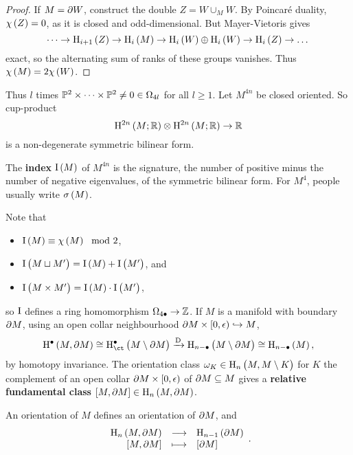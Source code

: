 \begin{proof}
If $ M = \partial W $, construct the double $ Z = W \cup_M W $. By Poincar\'e duality, $ \chi\br{Z} = 0 $, as it is closed and odd-dimensional. But Mayer-Vietoris gives
$$ \dots \to \H_{i + 1}\br{Z} \to \H_i\br{M} \to \H_i\br{W} \oplus \H_i\br{W} \to \H_i\br{Z} \to \dots $$
exact, so the alternating sum of ranks of these groups vanishes. Thus $ \chi\br{M} = 2\chi\br{W} $.
\end{proof}

Thus $ l $ times $ \mathbb{P}^2 \times \dots \times \mathbb{P}^2 \ne 0 \in \Omega_{4l} $ for all $ l \ge 1 $. Let $ M^{4n} $ be closed oriented. So cup-product
$$ \H^{2n}\br{M; \RR} \otimes \H^{2n}\br{M; \RR} \to \RR $$
is a non-degenerate symmetric bilinear form.

\begin{definition*}
The \textbf{index} $ \I\br{M} $ of $ M^{4n} $ is the signature, the number of positive minus the number of negative eigenvalues, of the symmetric bilinear form. For $ M^4 $, people usually write $ \sigma\br{M} $.
\end{definition*}

Note that
\begin{itemize}
\item $ \I\br{M} \equiv \chi\br{M} \mod 2 $,
\item $ \I\br{M \sqcup M'} = \I\br{M} + \I\br{M'} $, and
\item $ \I\br{M \times M'} = \I\br{M} \cdot \I\br{M'} $,
\end{itemize}
so $ \mathrm{I} $ defines a ring homomorphism $ \Omega_{4\bullet} \to \mathbb{Z} $. If $ M $ is a manifold with boundary $ \partial M $, using an open collar neighbourhood $ \da M \times \intco{0, \epsilon} \hookrightarrow M $,
$$ \H^\bullet\br{M, \da M} \cong \Hc^\bullet\br{M \setminus \da M} \xrightarrow{\D} \H_{n - \bullet}\br{M \setminus \da M} \cong \H_{n - \bullet}\br{M}, $$
by homotopy invariance. The orientation class $ \omega_K \in \H_n\br{M, M \setminus K} $ for $ K $ the complement of an open collar $ \da M \times \intco{0, \epsilon} $ of $ \partial M \subseteq M $ gives a \textbf{relative fundamental class} $ \sbr{M, \da M} \in \H_n\br{M, \da M} $.

\begin{lemma}
\label{lem:boundaryorientation}
An orientation of $ M $ defines an orientation of $ \partial M $, and
$$ \function{\H_n\br{M, \da M}}{\H_{n - 1}\br{\da M}}{\sbr{M, \da M}}{\sbr{\da M}}. $$
\end{lemma}

\pagebreak

